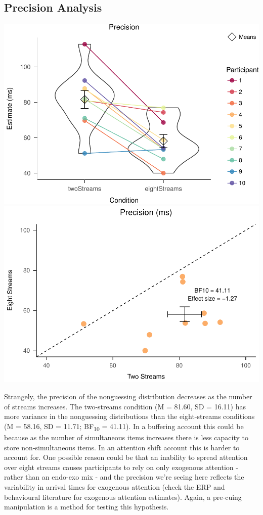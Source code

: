 \documentclass[,man]{apa6}
\theoremstyle{definition}
\theoremstyle{definition}
\theoremstyle{definition}
\theoremstyle{remark}
\begin{document}
\subsection{Precision Analysis}\label{precision-analysis}

\includegraphics{nStreams_Bayesian_files/figure-latex/unnamed-chunk-4-1.pdf}
\includegraphics{nStreams_Bayesian_files/figure-latex/unnamed-chunk-4-2.pdf}

Strangely, the precision of the nonguessing distribution decreases as
the number of streams increases. The two-streams condition (M = 81.60,
SD = 16.11) has more variance in the nonguessing distributions than the
eight-streams conditions (M = 58.16, SD = 11.71; BF\textsubscript{10} =
41.11). In a buffering account this could be because as the number of
simultaneous items increases there is less capacity to store
non-simultaneous items. In an attention shift account this is harder to
account for. One possible reason could be that an inability to spread
attention over eight streams causes participants to rely on only
exogenous attention - rather than an endo-exo mix - and the precision
we're seeing here reflects the variability in arrival times for
exogenous attention (check the ERP and behavioural literature for
exogenous attention estimates). Again, a pre-cuing manipulation is a
method for testing this hypothesis.
\end{document}
